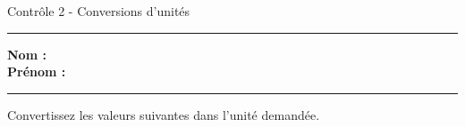 \documentclass[11pt,a4paper]{article}
\begin{document}
\begin{center}
 \LARGE{Contrôle 2 - Conversions d'unités} \\[3mm]
\end{center}
\hrule
\vspace{0.3cm}

\textbf{Nom :} \\[1mm]
\textbf{Prénom :} \\[1mm]
\hrule 
\vspace{1cm}

\begin{center}
    Convertissez les valeurs suivantes dans l'unité demandée.
\end{center}
\vspace{5mm}

\end{document}
